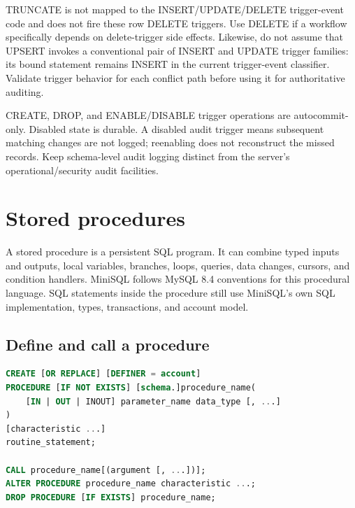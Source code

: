 TRUNCATE is not mapped to the INSERT/UPDATE/DELETE trigger-event code and does not fire these row DELETE triggers. Use DELETE if a workflow specifically depends on delete-trigger side effects. Likewise, do not assume that UPSERT invokes a conventional pair of INSERT and UPDATE trigger families: its bound statement remains INSERT in the current trigger-event classifier. Validate trigger behavior for each conflict path before using it for authoritative auditing.

CREATE, DROP, and ENABLE/DISABLE trigger operations are autocommit-only. Disabled state is durable. A disabled audit trigger means subsequent matching changes are not logged; reenabling does not reconstruct the missed records. Keep schema-level audit logging distinct from the server's operational/security audit facilities.


\section{Stored procedures}
\label{sql:procedures}

A stored procedure is a persistent SQL program. It can combine typed inputs and
outputs, local variables, branches, loops, queries, data changes, cursors, and
condition handlers. MiniSQL follows MySQL 8.4 conventions for this procedural
language. SQL statements inside the procedure still use MiniSQL's own SQL
implementation, types, transactions, and account model.

\subsection{Define and call a procedure}

\begin{lstlisting}[language=SQL]
CREATE [OR REPLACE] [DEFINER = account]
PROCEDURE [IF NOT EXISTS] [schema.]procedure_name(
    [IN | OUT | INOUT] parameter_name data_type [, ...]
)
[characteristic ...]
routine_statement;

CALL procedure_name[(argument [, ...])];
ALTER PROCEDURE procedure_name characteristic ...;
DROP PROCEDURE [IF EXISTS] procedure_name;
\end{lstlisting}

